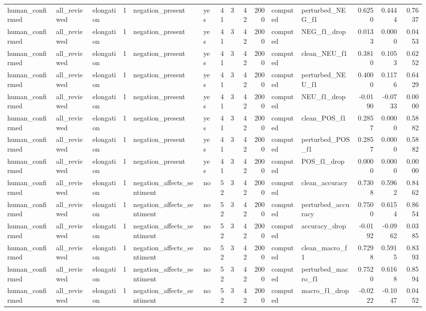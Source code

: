 \begin{tabular}{lllrllrrrrllrrr}
human_confirmed & all_reviewed & elongation & 1 & negation_present & yes & 41 & 3 & 42 & 2000 & computed & perturbed_NEG_f1 & 0.6250 & 0.4444 & 0.7637 \\
human_confirmed & all_reviewed & elongation & 1 & negation_present & yes & 41 & 3 & 42 & 2000 & computed & NEG_f1_drop & 0.0133 & 0.0000 & 0.0453 \\
human_confirmed & all_reviewed & elongation & 1 & negation_present & yes & 41 & 3 & 42 & 2000 & computed & clean_NEU_f1 & 0.3810 & 0.1053 & 0.6252 \\
human_confirmed & all_reviewed & elongation & 1 & negation_present & yes & 41 & 3 & 42 & 2000 & computed & perturbed_NEU_f1 & 0.4000 & 0.1176 & 0.6429 \\
human_confirmed & all_reviewed & elongation & 1 & negation_present & yes & 41 & 3 & 42 & 2000 & computed & NEU_f1_drop & -0.0190 & -0.0733 & 0.0000 \\
human_confirmed & all_reviewed & elongation & 1 & negation_present & yes & 41 & 3 & 42 & 2000 & computed & clean_POS_f1 & 0.2857 & 0.0000 & 0.5882 \\
human_confirmed & all_reviewed & elongation & 1 & negation_present & yes & 41 & 3 & 42 & 2000 & computed & perturbed_POS_f1 & 0.2857 & 0.0000 & 0.5882 \\
human_confirmed & all_reviewed & elongation & 1 & negation_present & yes & 41 & 3 & 42 & 2000 & computed & POS_f1_drop & 0.0000 & 0.0000 & 0.0000 \\
human_confirmed & all_reviewed & elongation & 1 & negation_affects_sentiment & no & 52 & 3 & 42 & 2000 & computed & clean_accuracy & 0.7308 & 0.5962 & 0.8462 \\
human_confirmed & all_reviewed & elongation & 1 & negation_affects_sentiment & no & 52 & 3 & 42 & 2000 & computed & perturbed_accuracy & 0.7500 & 0.6154 & 0.8654 \\
human_confirmed & all_reviewed & elongation & 1 & negation_affects_sentiment & no & 52 & 3 & 42 & 2000 & computed & accuracy_drop & -0.0192 & -0.0962 & 0.0385 \\
human_confirmed & all_reviewed & elongation & 1 & negation_affects_sentiment & no & 52 & 3 & 42 & 2000 & computed & clean_macro_f1 & 0.7298 & 0.5915 & 0.8393 \\
human_confirmed & all_reviewed & elongation & 1 & negation_affects_sentiment & no & 52 & 3 & 42 & 2000 & computed & perturbed_macro_f1 & 0.7520 & 0.6168 & 0.8594 \\
human_confirmed & all_reviewed & elongation & 1 & negation_affects_sentiment & no & 52 & 3 & 42 & 2000 & computed & macro_f1_drop & -0.0222 & -0.1047 & 0.0452 \\

\end{tabular}
